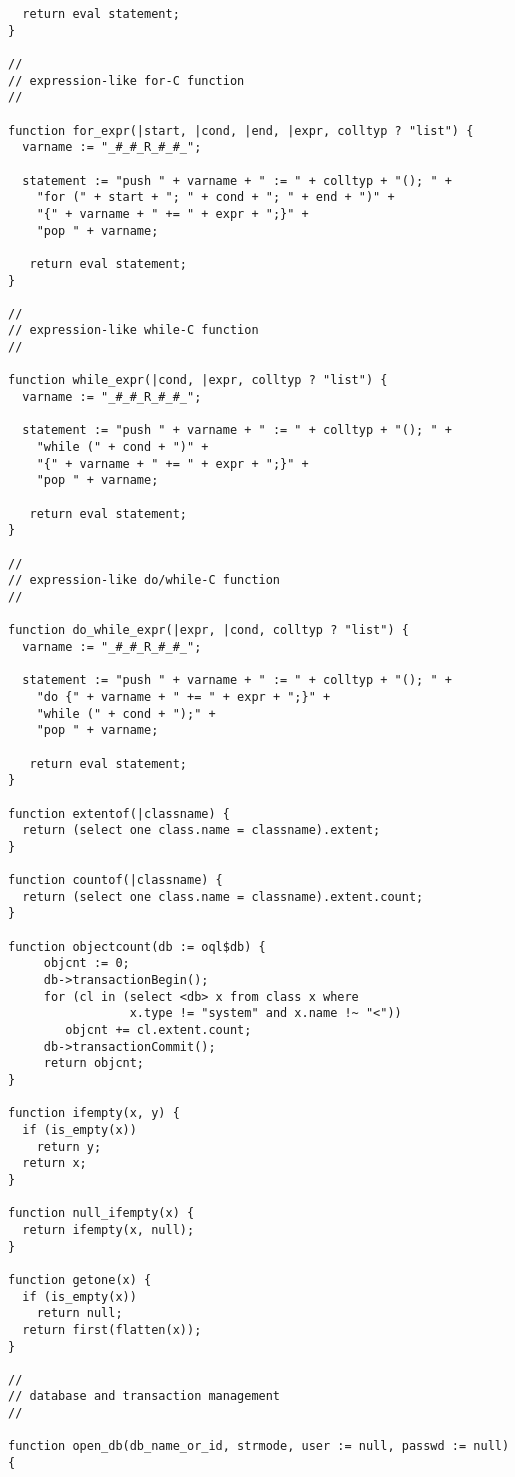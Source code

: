 \begin{verbatim}
  return eval statement;
}

//
// expression-like for-C function
//

function for_expr(|start, |cond, |end, |expr, colltyp ? "list") {
  varname := "_#_#_R_#_#_";

  statement := "push " + varname + " := " + colltyp + "(); " +
    "for (" + start + "; " + cond + "; " + end + ")" +
    "{" + varname + " += " + expr + ";}" +
    "pop " + varname;
   
   return eval statement;
}

//
// expression-like while-C function
//

function while_expr(|cond, |expr, colltyp ? "list") {
  varname := "_#_#_R_#_#_";

  statement := "push " + varname + " := " + colltyp + "(); " +
    "while (" + cond + ")" +
    "{" + varname + " += " + expr + ";}" +
    "pop " + varname;
   
   return eval statement;
}

//
// expression-like do/while-C function
//

function do_while_expr(|expr, |cond, colltyp ? "list") {
  varname := "_#_#_R_#_#_";

  statement := "push " + varname + " := " + colltyp + "(); " +
    "do {" + varname + " += " + expr + ";}" +
    "while (" + cond + ");" +
    "pop " + varname;
  
   return eval statement;
}

function extentof(|classname) {
  return (select one class.name = classname).extent;
}

function countof(|classname) {
  return (select one class.name = classname).extent.count;
}

function objectcount(db := oql$db) {
     objcnt := 0;
     db->transactionBegin();
     for (cl in (select <db> x from class x where
                 x.type != "system" and x.name !~ "<"))
        objcnt += cl.extent.count;
     db->transactionCommit();
     return objcnt;
}

function ifempty(x, y) {
  if (is_empty(x)) 
    return y;
  return x;
}

function null_ifempty(x) {
  return ifempty(x, null);
}

function getone(x) {
  if (is_empty(x)) 
    return null;
  return first(flatten(x));
}

//
// database and transaction management
//

function open_db(db_name_or_id, strmode, user := null, passwd := null) {


\end{verbatim}
